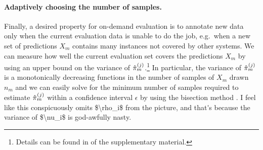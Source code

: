 \paragraph{Adaptively choosing the number of samples.}
Finally, a desired property for on-demand evaluation is to annotate  new data  only when the current evaluation data  is unable to do the job, e.g.\ when a new set of predictions $X_m$ contains many instances not covered by other systems.
We can measure how well the current evaluation set covers the predictions $X_m$ by using an upper bound on the variance of ${\hat{\pi}}_m^{(j)}$.\footnote{Details can be found in  of the supplementary material.}
In particular, the variance of ${\hat{\pi}}_m^{(j)}$ is a monotonically decreasing functions in the number of samples of $X_m$ drawn $n_m$ and we can easily solve for the minimum number of samples required to estimate ${\hat{\pi}}_m^{(j)}$ within a confidence interval $\epsilon$ by using the bisection method \citep{burden1985bisection}. \ac{I feel like this conspicuously omits $\rho_i$ from the picture, and that's because the variance of $\nu_i$ is god-awfully nasty.}


